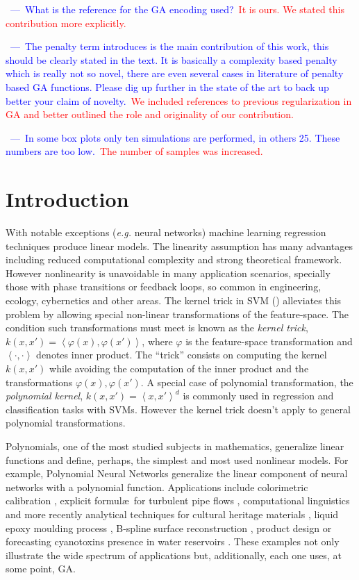 \documentclass[review,preprint]{elsarticle}
\newcommand{\at}[1]{\ensuremath{\!\left(#1\right)}}
\newcommand{\review}[1]{\textcolor{blue}{~---~#1}}
\newcommand{\revised}[2]{\review{#1}~\textcolor{red}{#2}}
\begin{document}
\revised{What is the reference for the GA encoding used?}{It is ours. We stated this contribution more explicitly.}

\revised{The penalty term introduces is the main contribution of this work, this should be clearly stated in the text. It is basically a complexity based penalty which is really not so novel, there are even several cases in literature of penalty based GA functions.  Please dig up further in the state of the art to back up better your claim of novelty.}{We included references to previous regularization in GA and better outlined the role and originality of our contribution.}

\revised{In some box plots only ten simulations are performed, in others 25.  These numbers are too low.}{The number of samples was increased.}
%
%
\linenumbers

\section{Introduction}
With notable exceptions (\emph{e.g.} neural networks) machine learning regression techniques produce linear models. The linearity assumption has many advantages including reduced computational complexity and strong the\-o\-re\-ti\-cal framework. However nonlinearity is unavoidable in many application scenarios, specially those with phase transitions or feedback loops, so common in engineering, ecology, cybernetics and other areas. The kernel trick in \ac{SVM} (\cite{scholkopf1997kernel, liang2012eigen, Bao:2013aa}) alleviates this problem by allowing special non-linear transformations of the feature-space. The condition such transformations must meet is known as the \emph{kernel trick}, $k\at{x,x'} = \left< \varphi\at{x}, \varphi\at{x'} \right>$, where $\varphi$ is the feature-space transformation and $\left<\cdot,\cdot\right>$ denotes inner product. The ``trick'' consists on computing the kernel $k\at{x,x'}$ while avoiding the computation of the inner product and the transformations $\varphi\at{x}, \varphi\at{x'}$. A special case of polynomial transformation, the \emph{polynomial kernel}, $k\at{x,x'} = \left<x,x'\right>^d$ is commonly used in regression and classification tasks with \acp{SVM}. However the kernel trick doesn't apply to general polynomial transformations.

Polynomials, one of the most studied subjects in mathematics, generalize li\-ne\-ar functions and define, perhaps, the simplest and most used nonlinear models. For example, Polynomial Neural Networks \cite{dehuri2011condensed} generalize the linear component of neural networks with a polynomial function. Applications include colorimetric calibration \citep{Mendes:2005aa}, explicit formul\ae\ for turbulent pipe flows
 \citep{Davidson:1999aa}, computational linguistics \citep{Sanchez:2009aa} and more recently analytical techniques for cultural heritage materials \citep{Csefalvayova:2010aa}, liquid epoxy moulding process \citep{Chan:2011aa}, B-spline surface reconstruction \citep{Galvez:2012aa}, product design \citep{Chan:2012aa} or forecasting cyanotoxins presence in water reservoirs \citep{Garcia-Nieto:2013aa}. These examples not only illustrate the wide spectrum of applications but, additionally, each one uses, at some point, \ac{GA}.
\end{document}
